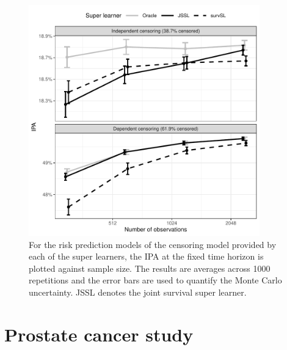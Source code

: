 \documentclass[alpha-refs]{wiley-article}
\newcommand{\1}{\mathds{1}}
\begin{document}
\begin{figure}[ht]
  \begin{center}
      \includegraphics[width=10cm]{experiment-fig-sl-survSL-cens}
  \end{center}
\caption{For the risk prediction models of the censoring model
    provided by each of the super learners, the IPA at the fixed time
    horizon is plotted against sample size. The results are averages
    across 1000 repetitions and the error bars are used to quantify
    the Monte Carlo uncertainty. JSSL denotes the joint survival super
    learner.}
\label{fig:zelefski-cens}
\end{figure}

\section{Prostate cancer study}
\label{sec:real-data-appl}
\end{document}
